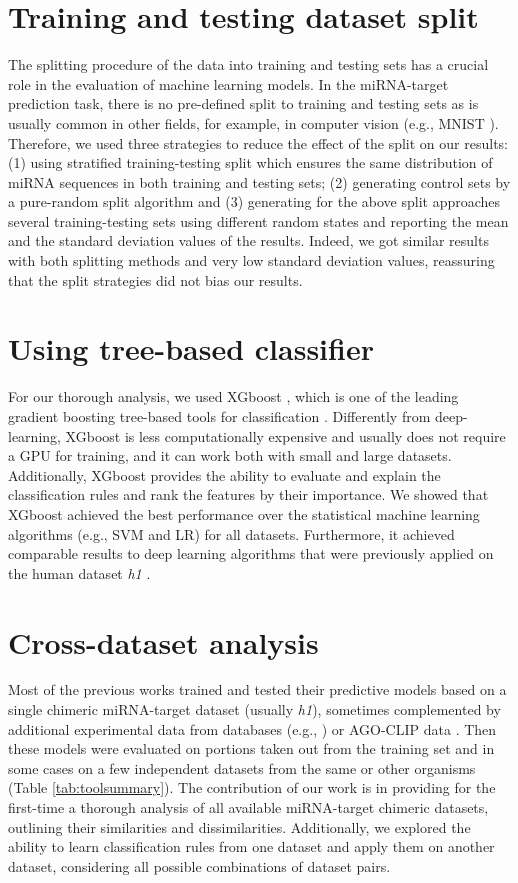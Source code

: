 \section{Training and testing dataset split} 
The splitting procedure of the data into training and testing sets has a crucial role in the evaluation of machine learning models. In the miRNA-target prediction task, there is no pre-defined split to training and testing sets as is usually common in other fields, for example, in computer vision (e.g., MNIST \cite{mnist10027939599}). Therefore, we used three strategies to reduce the effect of the split on our results: (1) using stratified training-testing split which ensures the same distribution of miRNA sequences in both training and testing sets; (2) generating control sets by a pure-random split algorithm and (3) generating for the above split approaches several training-testing sets using different random states and reporting the mean and the standard deviation values of the results. Indeed, we got similar results with both splitting methods and very low standard deviation values, reassuring that the split strategies did not bias our results.

\section{Using tree-based classifier} 
For our thorough analysis, we used XGboost \cite{xgboost}, which is one of the leading gradient boosting tree-based tools for classification \cite{nielsen2016tree}. Differently from deep-learning, XGboost is less computationally expensive and usually does not require a GPU for training, and it can work both with small and large datasets. Additionally, XGboost provides the ability to evaluate and explain the classification rules and rank the features by their importance. 
We showed that XGboost achieved the best performance over the statistical machine learning algorithms (e.g., SVM and LR) for all datasets. Furthermore, it achieved comparable results to deep learning algorithms that were previously applied on the human dataset \textit{h1} \cite{wen2018deepmirtar, lee2016deeptarget}.

\section{Cross-dataset analysis}
Most of the previous works trained and tested their predictive models based on a single chimeric miRNA-target dataset (usually \textit{h1}), sometimes complemented by additional experimental data from databases (e.g., \cite{xiao2009mirecords,chou2016mirtarbase}) or AGO-CLIP data \cite{ding2016tarpmir,wen2018deepmirtar,paker2019mirlstm, lu2016learning, pla2018miraw}. Then these models were evaluated on portions taken out from the training set and in some cases on a few independent datasets from the same or other organisms  (Table \ref{tab:toolsummary}). 
The contribution of our work is in providing for the first-time a thorough analysis of all available miRNA-target chimeric datasets, outlining their similarities and dissimilarities. Additionally, we explored the ability to learn classification rules from one dataset and apply them on another dataset, considering all possible combinations of dataset pairs.

